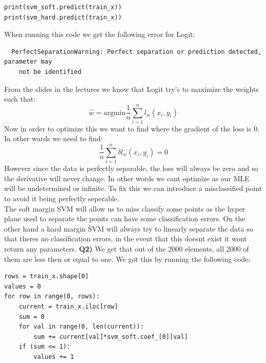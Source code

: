 \documentclass{article}
\begin{document}
\begin{titlepage}
\begin{lstlisting}
print(svm_soft.predict(train_x))
print(svm_hard.predict(train_x))
\end{lstlisting}
When running this code we get the following error for Logit:
\begin{verbatim}
  PerfectSeparationWarning: Perfect separation or prediction detected, parameter may 
    not be identified
\end{verbatim}
From the slides in the lectures we know that Logit try's to maximize the weights such that:
\[ \hat{w}= \text{arg}\text{min}\frac{1}{n} \sum_{i=1}^n l_w(x_i, y_i) \]
Now in order to optimize this we want to find where the gradient of the loss is 0. In other wards we need to find:
\[ \frac{1}{n} \sum_{i=1}^n \delta l_w(x_i, y_i) = 0\]
However since the data is perfectly separable, the loss will always be zero and so the derivative will never change. In other words we cant optimize as our MLE will be undetermined or infinite. To fix this we can introduce a misclassified point to avoid it being perfectly seperable. \\
The soft margin SVM will allow us to miss classify some points as the hyper plane used to separate the points can have some classification errors. On the other hand a hard margin SVM will always try to linearly separate the data so that theres no classification errors, in the event that this doesnt exist it wont return any parameters.
\newpage
\textbf{Q2)} We get that out of the 2000 elements, all 2000 of them are less then or equal to one. We got this by running the following code:
\begin{lstlisting}
rows = train_x.shape[0]
values = 0
for row in range(0, rows):
    current = train_x.iloc[row]
    sum = 0
    for val in range(0, len(current)):
        sum += current[val]*svm_soft.coef_[0][val]
    if (sum <= 1):
        values += 1
        

\end{lstlisting}
\end{titlepage}
\end{document}
